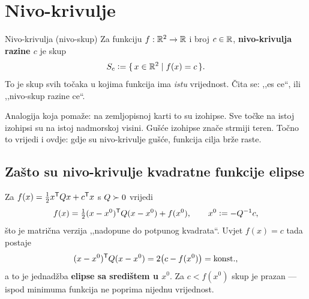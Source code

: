 \section{Nivo-krivulje}
\label{sec:nivo-krivulje}

\begin{pojam}{Nivo-krivulja (nivo-skup)}
Za funkciju $f: \mathbb{R}^2 \to \mathbb{R}$ i broj $c \in \mathbb{R}$, \textbf{nivo-krivulja razine $c$} je
skup
\begin{equation}
S_c \mathrel{\vcentcolon=} \{\, x \in \mathbb{R}^2 \mid f(x) = c \,\}.
\end{equation}
To je skup svih točaka u kojima funkcija ima \emph{istu} vrijednost. Čita se:
,,es ce``, ili ,,nivo-skup razine ce``.
\end{pojam}

Analogija koja pomaže: na zemljopisnoj karti to su izohipse. Sve točke na istoj
izohipsi su na istoj nadmorskoj visini. Gušće izohipse znače strmiji teren.
Točno to vrijedi i ovdje: gdje su nivo-krivulje gušće, funkcija cilja brže
raste.

\subsection{Zašto su nivo-krivulje kvadratne funkcije elipse}

Za $f(x) = \tfrac{1}{2}x^{\mathsf{T}} Qx + c^{\mathsf{T}} x$ s $Q \succ 0$ vrijedi
\begin{equation}
f(x) = \tfrac{1}{2}(x - x^{0})^{\mathsf{T}} Q (x - x^{0}) + f(x^{0}),
\qquad x^{0} \mathrel{\vcentcolon=} -Q^{-1}c ,
\label{eq:dopuna-kvadrata}
\end{equation}
što je matrična verzija ,,nadopune do potpunog kvadrata``. Uvjet $f(x) = c$ tada
postaje
\begin{equation}
(x - x^{0})^{\mathsf{T}} Q (x - x^{0}) = 2\bigl(c - f(x^{0})\bigr) = \text{konst.},
\end{equation}
a to je jednadžba \textbf{elipse sa središtem u $x^{0}$}. Za $c < f(x^{0})$ skup
je prazan --- ispod minimuma funkcija ne poprima nijednu vrijednost.

